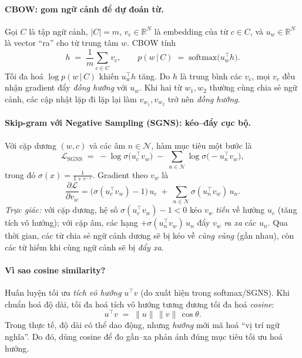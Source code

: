 \paragraph{CBOW: gom ngữ cảnh để dự đoán từ.}
Gọi $C$ là tập ngữ cảnh, $|C|=m$, $v_c \in \mathbb{R}^N$ là embedding của từ $c\in C$, và $u_w \in \mathbb{R}^N$ là vector ``ra'' cho từ trung tâm $w$. CBOW tính
\[
h \;=\; \frac{1}{m}\sum_{c\in C} v_c,\qquad 
p(w\,|\,C) \;=\; \mathrm{softmax}\big(u_w^\top h\big).
\]
Tối đa hoá $\log p(w\,|\,C)$ khiến $u_w^\top h$ tăng. Do $h$ là trung bình các $v_c$, mọi $v_c$ đều nhận gradient đẩy \emph{đồng hướng} với $u_w$. Khi hai từ $w_1,w_2$ thường cùng chia sẻ ngữ cảnh, các cập nhật lặp đi lặp lại làm $v_{w_1},v_{w_2}$ trở nên \emph{đồng hướng}.

\paragraph{Skip-gram với Negative Sampling (SGNS): kéo--đẩy cục bộ.}
Với cặp dương $(w,c)$ và các âm $n\in\mathcal{N}$, hàm mục tiêu một bước là
\[
\mathcal{L}_{\text{SGNS}} \;=\; 
- \log \sigma\!\big(u_c^\top v_w\big) \;-\; \sum_{n\in\mathcal{N}} \log \sigma\!\big(-u_n^\top v_w\big),
\]
trong đó $\sigma(x)=\frac{1}{1+e^{-x}}$. Gradient theo $v_w$ là
\[
\frac{\partial \mathcal{L}}{\partial v_w}
= \big(\sigma(u_c^\top v_w)-1\big)\,u_c \;+\; \sum_{n\in\mathcal{N}} \sigma(u_n^\top v_w)\,u_n.
\]
\emph{Trực giác:} với cặp dương, hệ số $\sigma(u_c^\top v_w)-1<0$ kéo $v_w$ \emph{tiến} về hướng $u_c$ (tăng tích vô hướng); với cặp âm, các hạng $+\sigma(u_n^\top v_w)\,u_n$ đẩy $v_w$ \emph{ra xa} các $u_n$. Qua thời gian, các từ chia sẻ ngữ cảnh dương sẽ bị kéo về \emph{cùng vùng} (gần nhau), còn các từ hiếm khi cùng ngữ cảnh sẽ bị \emph{đẩy xa}.

\paragraph{Vì sao cosine similarity?}
Huấn luyện tối ưu \emph{tích vô hướng} $u^\top v$ (do xuất hiện trong softmax/SGNS). Khi chuẩn hoá độ dài, tối đa hoá tích vô hướng tương đương tối đa hoá \emph{cosine}:
\[
u^\top v \;=\; \|u\|\,\|v\|\,\cos\theta.
\]
Trong thực tế, độ dài có thể dao động, nhưng \emph{hướng} mới mã hoá ``vị trí ngữ nghĩa''. Do đó, dùng cosine để đo gần--xa phản ánh đúng mục tiêu tối ưu hoá hướng.

